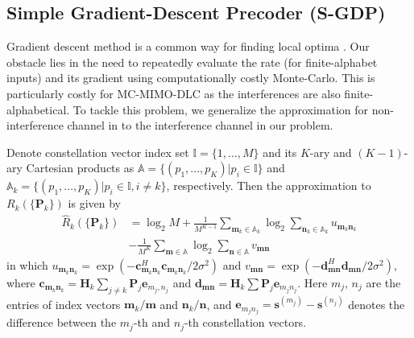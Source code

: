 \documentclass{article}
\begin{document}
    \subsection{Simple Gradient-Descent Precoder (S-GDP)}
    \label{ssec:SGDP}
    \vspace*{-2mm}

    Gradient descent method is a common way for finding local optima \cite{boyd2004convex}.
Our obstacle lies in the need to repeatedly evaluate the rate (for finite-alphabet inputs) and its gradient using
    computationally costly Monte-Carlo. This is particularly costly for MC-MIMO-DLC as the interferences are also finite-alphabetical.
    To tackle this problem, we generalize the approximation for non-interference channel in \cite{zeng2012low} to the interference channel in our problem.

    Denote constellation vector index set $\mathbb{I}=\{1,\ldots,M\}$ and its $K$-ary and $(K-1)$-ary Cartesian products as $\mathbb{A}=\{(p_1,\ldots,p_K)|p_i\in\mathbb{I}\}$ and $\mathbb{A}_k=\{(p_1,\ldots,p_K)|p_i\in\mathbb{I},i\not=k\}$, respectively. Then the approximation to $R_k(\{\mathbf{P}_k\})$ is given by
    \begin{align}
        \hat{R}_k(\{\mathbf{P}_k\}) & = \log_2M + \frac{1}{M^{K-1}} \sum_{\mathbf{m}_k\in \mathbb{A}_k}\log_2\sum_{\mathbf{n}_k\in \mathbb{A}_k}u_{\mathbf{m}_k\mathbf{n}_k}
        \nonumber\\
                                    & - \frac{1}{M^K}\sum_{\mathbf{m}\in \mathbb{A}}\log_2\sum_{\mathbf{n}\in \mathbb{A}}v_{\mathbf{m}\mathbf{n}}
        \label{eq:ARSGDP}
    \end{align}
    in which
$u_{\mathbf{m}_k\mathbf{n}_k}=\exp(-\mathbf{c}_{\mathbf{m}_k\mathbf{n}_k}^H\mathbf{c}_{\mathbf{m}_k\mathbf{n}_k}/2\sigma^2)$
and
$
 v_{\mathbf{m}\mathbf{n}}=\exp(-\mathbf{d}_{\mathbf{m}\mathbf{n}}^H\mathbf{d}_{\mathbf{m}\mathbf{n}}/2\sigma^2),
$    where $\mathbf{c}_{\mathbf{m}_k\mathbf{n}_k}=\mathbf{H}_k\sum_{j\not=k}\mathbf{P}_j\mathbf{e}_{m_j,n_j}$ and $\mathbf{d}_{\mathbf{m}\mathbf{n}}=\mathbf{H}_k\sum\mathbf{P}_j\mathbf{e}_{m_jn_j}$.
    Here $m_j,\,n_j$ are the entries of index vectors $\mathbf{m}_k/\mathbf{m}$ and ${\mathbf{n}_k/\mathbf{n}}$, and $\mathbf{e}_{m_jn_j} = \mathbf{s}^{(m_j)}-\mathbf{s}^{(n_j)}$ denotes the difference between the $m_j$-th and $n_j$-th constellation vectors.
\end{document}
